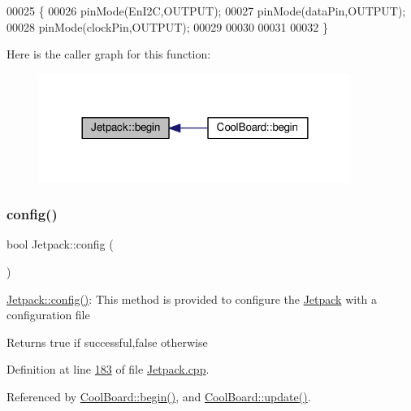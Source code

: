 \begin{DoxyCode}
00025  \{ 
00026     pinMode(EnI2C,OUTPUT);
00027     pinMode(dataPin,OUTPUT);
00028     pinMode(clockPin,OUTPUT);
00029     
00030     
00031 
00032  \}
\end{DoxyCode}
Here is the caller graph for this function\+:\nopagebreak
\begin{figure}[H]
\begin{center}
\leavevmode
\includegraphics[width=288pt]{class_jetpack_a5a53e1ebf7aaf3bf3e0d37ea64ca09a7_icgraph}
\end{center}
\end{figure}
\mbox{\label{class_jetpack_ab065ee83e244265a2223a22f3ee4a719}} 
\subsubsection{\texorpdfstring{config()}{config()}}
{\footnotesize\ttfamily bool Jetpack\+::config (\begin{DoxyParamCaption}{ }\end{DoxyParamCaption})}

\hyperlink{class_jetpack_ab065ee83e244265a2223a22f3ee4a719}{Jetpack\+::config()}\+: This method is provided to configure the \hyperlink{class_jetpack}{Jetpack} with a configuration file

\begin{DoxyReturn}{Returns}
true if successful,false otherwise 
\end{DoxyReturn}


Definition at line \hyperlink{_jetpack_8cpp_source_l00183}{183} of file \hyperlink{_jetpack_8cpp_source}{Jetpack.\+cpp}.



Referenced by \hyperlink{_cool_board_8cpp_source_l00021}{Cool\+Board\+::begin()}, and \hyperlink{_cool_board_8cpp_source_l00411}{Cool\+Board\+::update()}.



